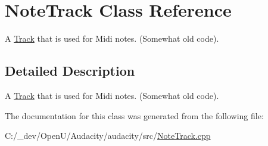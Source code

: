 \hypertarget{class_note_track}{}\section{Note\+Track Class Reference}
\label{class_note_track}


A \hyperlink{class_track}{Track} that is used for Midi notes. (Somewhat old code).  




\subsection{Detailed Description}
A \hyperlink{class_track}{Track} that is used for Midi notes. (Somewhat old code). 

The documentation for this class was generated from the following file\+:\begin{DoxyCompactItemize}
\item 
C\+:/\+\_\+dev/\+Open\+U/\+Audacity/audacity/src/\hyperlink{_note_track_8cpp}{Note\+Track.\+cpp}\end{DoxyCompactItemize}
